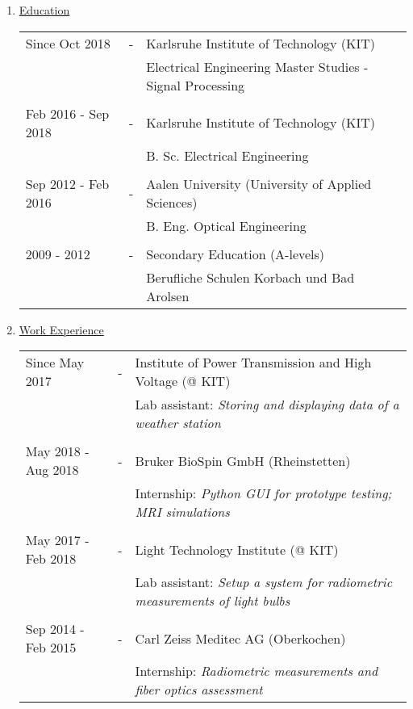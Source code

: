  
\begin{enumerate}[label=\Alph*.]
	\item \underline{Education}
	
	\begin{tabulary}{\textwidth}{@{}p{3.8cm} C L}
		Since Oct 2018 & - & Karlsruhe Institute of Technology (KIT) \\
		& & Electrical Engineering Master Studies - Signal Processing \\
		\\[-0.5em]
		Feb 2016 - Sep 2018 & - & Karlsruhe Institute of Technology (KIT) \\
		& & B. Sc. Electrical Engineering \\
		\\[-0.5em]
		Sep 2012 - Feb 2016 & - & Aalen University (University of Applied Sciences) \\
		& & B. Eng. Optical Engineering \\
		\\[-0.5em]
		2009 - 2012 & - & Secondary Education (A-levels) \\
		& & Berufliche Schulen Korbach und Bad Arolsen \\
	\end{tabulary}
	
	\item \underline{Work Experience}
	
	\begin{tabulary}{\textwidth}{@{}p{3.8cm}CL}
		Since May 2017 & - & Institute of Power Transmission and High Voltage (@ KIT) \\
		& & Lab assistant: \textit{Storing and displaying data of a weather station}\\
		\\[-0.5em]
		May 2018 - Aug 2018 & - & Bruker BioSpin GmbH (Rheinstetten) \\
		& & Internship: \textit{Python GUI for prototype testing; MRI simulations}  \\
		\\[-0.5em]
		May 2017 - Feb 2018 & - & Light Technology Institute (@ KIT) \\
		& & Lab assistant: \textit{Setup a system for radiometric measurements of light bulbs}  \\
		\\[-0.5em]
		Sep 2014 - Feb 2015 & - & Carl Zeiss Meditec AG (Oberkochen) \\
		& & Internship: \textit{Radiometric measurements and fiber optics assessment}  \\
	\end{tabulary}
	

\end{enumerate}
